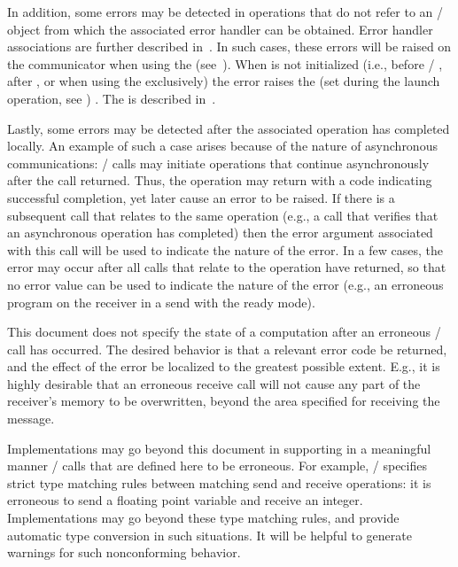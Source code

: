 In addition, some errors
may be detected in operations that do not refer to an \MPI/ object from which the
associated error handler can be obtained.
Error handler associations are further described in~.
In such cases, these errors will be raised on the communicator
 when using the \wpm{} (see~).
When  is not initialized (i.e.,
before  / , after , or when using the \spm{} exclusively)
the error raises the  (set during the launch operation, see )%
.
The \spm{} is described in~.

Lastly, some errors may be detected after the associated operation has completed locally.
An example of such a case arises because of the nature of asynchronous
communications:
\MPI/ calls may initiate operations that continue
asynchronously after the call returned.  Thus, the operation may return with a
code indicating successful completion, yet later cause an error to be
raised.  If there is a subsequent call that relates to the same
operation (e.g.,
a call that verifies that an asynchronous operation has completed) then the
error argument associated with this call will be used to indicate the nature
of the error.  In a few cases, the error may occur after all calls that
relate to the operation have returned, so that no error value can be used
to indicate the nature of the error (e.g., an erroneous program on the receiver in
a send with the ready mode).

This document does not specify the state of a computation after an erroneous
\MPI/ call has occurred.
The desired behavior is that a relevant error code be returned, and the effect
of the error be localized to the greatest possible extent.  E.g., it is highly
desirable that an erroneous receive call will not cause any part of the
receiver's memory to be overwritten, beyond the area specified for receiving the
message.

Implementations may
go beyond this document in supporting in a meaningful manner \MPI/ calls
that are defined here to be erroneous.   For example, \MPI/ specifies
strict type matching rules between matching send and receive
operations: it is erroneous to send a floating point variable and receive an
integer.  Implementations may go beyond these type matching rules, and provide
automatic type conversion in such situations.  It will be helpful to generate
warnings for such nonconforming behavior.

